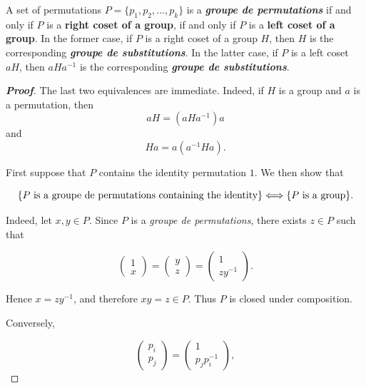 \documentclass[10pt,a4paper]{amsart}
\begin{document}
\begin{lemma}
	\label{lem:een}
	A set of permutations \(P=\{p_1,p_2,\dots,p_k\}\) is a \textbf{\textit{groupe de permutations}} if and only if \(P\) is a \textbf{right coset of a group}, if and only if \(P\) is a \textbf{left coset of a group}. In the former case, if \(P\) is a right coset of a group \(H\), then \(H\) is the corresponding \textbf{\textit{groupe de substitutions}}. In the latter case, if \(P\) is a left coset \(aH\), then \(aHa^{-1}\) is the corresponding \textbf{\textit{groupe de substitutions}}.
\end{lemma}

\begin{proof}[\normalfont\bfseries Proof]
	
	The last two equivalences are immediate. Indeed, if \(H\) is a group and \(a\) is a permutation, then
	\[
	aH=(aHa^{-1})a
	\]
	and
	\[
	Ha=a(a^{-1}Ha).
	\]
	
	First suppose that \(P\) contains the identity permutation \(1\). We then show that
	
	\[
	\{\text{\(P\) is a \textit{groupe de permutations} containing the identity}\}
	\Longleftrightarrow
	\{\text{\(P\) is a group}\}.
	\]
	
	Indeed, let \(x,y\in P\). Since \(P\) is a \textit{groupe de permutations}, there exists \(z\in P\) such that
	
	\[
	\left(
	\begin{array}{c}
		1\\
		x
	\end{array}
	\right)
	=
	\left(
	\begin{array}{c}
		y\\
		z
	\end{array}
	\right)
	=
	\left(
	\begin{array}{c}
		1\\
		zy^{-1}
	\end{array}
	\right).
	\]
	
	Hence \(x=zy^{-1}\), and therefore \(xy=z\in P\). Thus \(P\) is closed under composition.
	
	Conversely,
	
	\[
	\left(
	\begin{array}{c}
		p_i\\
		p_j
	\end{array}
	\right)
	=
	\left(
	\begin{array}{c}
		1\\
		p_jp_i^{-1}
	\end{array}
	\right),
	\]
	

\end{proof}
\end{document}
